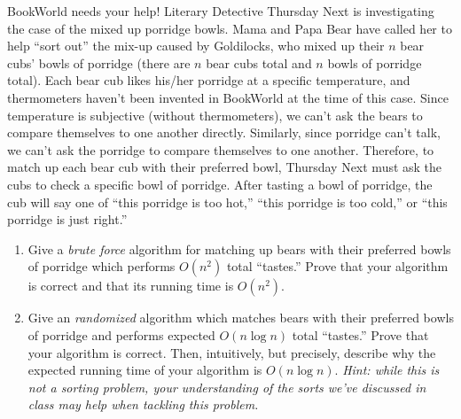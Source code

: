 \documentclass[10pt]{article}
\begin{document}
\noindent BookWorld needs your help! Literary Detective Thursday Next is investigating the case of the mixed up porridge bowls.  Mama and Papa Bear have called her to help ``sort out'' the mix-up caused by Goldilocks, who mixed up their $n$ bear cubs' bowls of porridge (there are $n$ bear cubs total and $n$ bowls of porridge total).  Each bear cub likes his/her porridge at a specific temperature, and thermometers haven't been invented in BookWorld at the time of this case.  Since temperature is subjective (without thermometers), we can't ask the bears to compare themselves to one another directly.  Similarly, since porridge can't talk, we can't ask the porridge to compare themselves to one another.  Therefore, to match up each bear cub with their preferred bowl, Thursday Next must ask the cubs to check a specific bowl of porridge.  After tasting a bowl of porridge, the cub will say one of ``this porridge is too hot,'' ``this porridge is too cold,'' or ``this porridge is just right.''
\begin{enumerate}
    \item Give a {\em brute force} algorithm for matching up bears with their preferred bowls of porridge which performs $O(n^2)$ total ``tastes.'' Prove that your algorithm is correct and that its running time is $O(n^2)$.
    \item Give an {\em randomized} algorithm which matches bears with their preferred bowls of porridge and performs expected $O(n \log n)$ total ``tastes.'' Prove that your algorithm is correct. Then, intuitively, but precisely, describe why the expected running time of your algorithm is $O(n \log n)$. {\em Hint: while this is not a sorting problem, your understanding of the sorts we've discussed in class may help when tackling this problem.}
\end{enumerate}
\end{document}
